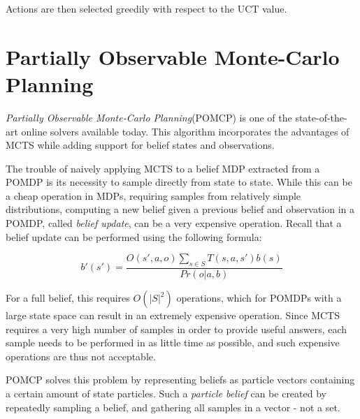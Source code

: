 Actions are then selected greedily with respect to the UCT value.

\section[]{Partially Observable Monte-Carlo Planning%
}

\textit{Partially Observable Monte-Carlo Planning}(POMCP) \cite{cit:pomcp} is one of the
state-of-the-art online solvers available today. This algorithm incorporates the advantages of MCTS
while adding support for belief states and observations.

The trouble of naively applying MCTS to a belief MDP extracted from a POMDP is its necessity to
sample directly from state to state. While this can be a cheap operation in MDPs, requiring
samples from relatively simple distributions, computing a new belief given a previous belief and
observation in a POMDP, called \textit{belief update}, can be a very expensive operation. Recall that a belief
update can be performed using the following formula:

\[ b'(s') = \frac{O(s', a, o)\sum_{s\in S}T(s,a,s')b(s)}{Pr(o|a,b)} \]

For a full belief, this requires $O(|S|^2)$ operations, which for POMDPs with a large state space
can result in an extremely expensive operation. Since MCTS requires a very high number of samples in
order to provide useful answers, each sample needs to be performed in as little time as possible,
and such expensive operations are thus not acceptable.

POMCP solves this problem by representing beliefs as particle vectors containing a certain amount of
state particles. Such a \textit{particle belief} can be created by repeatedly sampling a belief, and
gathering all samples in a vector - not a set.

